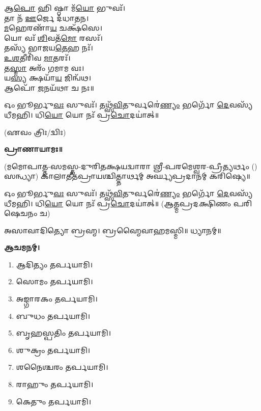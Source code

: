 𑌆\-\ul{𑌪𑍋} 𑌹𑌿 𑌷𑍍𑌠𑌾 𑌮᳴\-\ul{𑌯𑍋} 𑌭𑍁𑌵𑌃᳴।\\
𑌤𑌾 𑌨᳴ \ul{𑌊}\-𑌰𑍍𑌜𑍇 𑌦᳴𑌧𑌾𑌤𑌨।\\
\-\ul{𑌮}\-𑌹𑍇𑌰𑌣𑌾᳴\-\ul{𑌯} 𑌚𑌕𑍍𑌷᳴𑌸𑍇।\\
𑌯𑍋 𑌵𑌃᳴ \ul{𑌶𑌿}\-𑌵𑌤᳴\-\ul{𑌮𑍋} 𑌰𑌸𑌃᳴।\\
𑌤𑌸𑍍𑌯᳴ 𑌭𑌾𑌜𑌯\-\ul{𑌤𑍇}\-𑌹 𑌨𑌃᳴।\\
\-\ul{𑌉}\-\-\ul{𑌶}\-𑌤𑍀𑌰𑌿᳴𑌵 \ul{𑌮𑌾}\-𑌤𑌰𑌃᳴।\\
𑌤\-\ul{𑌸𑍍𑌮𑌾} 𑌅𑌰𑌂᳴ 𑌗𑌮𑌾𑌮 𑌵𑌃।\\
𑌯\-\ul{𑌸𑍍𑌯} 𑌕𑍍𑌷𑌯𑌾᳴\-\ul{𑌯} 𑌜𑌿𑌨𑍍𑌵᳴𑌥।\\
𑌆𑌪𑍋᳴ \ul{𑌜}\-𑌨𑌯᳴𑌥𑌾 𑌚 𑌨𑌃॥\\


𑌓𑌂 𑌭𑍂𑌰𑍍𑌭𑍁\-\ul{𑌵𑌃} 𑌸𑍁𑌵𑌃᳴। 𑌤𑌥𑍍𑌸᳴\-\ul{𑌵𑌿}\-𑌤𑍁𑌰𑍍𑌵𑌰𑍇॑\-\ul{𑌣𑍍𑌯𑌂} 𑌭𑌰𑍍𑌗𑍋᳴ \ul{𑌦𑍇}\-𑌵𑌸𑍍𑌯᳴ 𑌧𑍀𑌮𑌹𑌿। 𑌧𑌿\-\ul{𑌯𑍋} 𑌯𑍋 𑌨𑌃᳴ 𑌪𑍍𑌰\-\ul{𑌚𑍋}\-𑌦𑌯𑌾॑𑌤𑍍॥

\hfill{(𑌏𑌵𑌂 𑌤𑍍𑌰𑌿𑌃/𑌦𑍍𑌵𑌿𑌃)}


\textbf{𑌪𑍍𑌰𑌾𑌣𑌾𑌯𑌾𑌮𑌃॥}

(𑌮𑌮𑍋𑌪𑌾𑌤𑍍𑌤-𑌸𑌮𑌸𑍍𑌤-𑌦𑍁𑌰𑌿𑌤𑌕𑍍𑌷𑌯𑌦𑍍𑌵𑌾𑌰𑌾 𑌶𑍍𑌰𑍀-𑌪𑌰𑌮𑍇𑌶𑍍𑌵𑌰-𑌪𑍍𑌰𑍀𑌤𑍍𑌯𑌰𑍍𑌥𑌂 () 𑌸𑌨𑍍𑌧𑍍𑌯𑌾)
𑌕𑌾𑌲𑌾𑌤𑍀𑌤𑌪𑍍𑌰𑌾𑌯𑌶𑍍𑌚𑌿𑌤𑍍𑌤𑌾𑌰𑍍𑌥𑌮𑍍 𑌅𑌰𑍍𑌘𑍍𑌯𑌪𑍍𑌰𑌦𑌾𑌨𑌮𑍍 𑌕𑌰𑌿𑌷𑍍𑌯𑍇॥

𑌓𑌂 𑌭𑍂𑌰𑍍𑌭𑍁\-\ul{𑌵𑌃} 𑌸𑍁𑌵𑌃᳴। 𑌤𑌥𑍍𑌸᳴\-\ul{𑌵𑌿}\-𑌤𑍁𑌰𑍍𑌵𑌰𑍇॑\-\ul{𑌣𑍍𑌯𑌂} 𑌭𑌰𑍍𑌗𑍋᳴ \ul{𑌦𑍇}\-𑌵𑌸𑍍𑌯᳴ 𑌧𑍀𑌮𑌹𑌿। 𑌧𑌿\-\ul{𑌯𑍋} 𑌯𑍋 𑌨𑌃᳴ 𑌪𑍍𑌰\-\ul{𑌚𑍋}\-𑌦𑌯𑌾॑𑌤𑍍॥
\nopagebreak[4]
(𑌆𑌤𑍍𑌮𑌪𑍍𑌰𑌦𑌕𑍍𑌷𑌿𑌣𑌂 𑌪𑌰𑌿𑌷𑍇𑌚𑌨𑌂 𑌚)


𑌅𑌸𑌾𑌵𑌾𑌦𑌿𑌤𑍍𑌯𑍋 𑌬𑍍𑌰𑌹𑍍𑌮। 𑌬𑍍𑌰𑌹𑍍𑌮𑍈𑌵𑌾𑌹𑌮𑌸𑍍𑌮𑌿॥ 𑌧𑍍𑌯𑌾𑌨𑌮𑍍॥

\textbf{𑌆𑌚𑌮𑌨𑌮𑍍।}



\begin{multicols}{2}
\begin{enumerate}
 \item 𑌆𑌦𑌿𑌤𑍍𑌯𑌂 𑌤𑌰𑍍𑌪𑌯𑌾𑌮𑌿।
 \item 𑌸𑍋𑌮𑌂 𑌤𑌰𑍍𑌪𑌯𑌾𑌮𑌿।
 \item 𑌅𑌙𑍍𑌗𑌾𑌰𑌕𑌂 𑌤𑌰𑍍𑌪𑌯𑌾𑌮𑌿।
 \item 𑌬𑍁𑌧𑌂 𑌤𑌰𑍍𑌪𑌯𑌾𑌮𑌿।
 \item 𑌬𑍃𑌹𑌸𑍍𑌪𑌤𑌿𑌂 𑌤𑌰𑍍𑌪𑌯𑌾𑌮𑌿।
 \item 𑌶𑍁𑌕𑍍𑌰𑌂 𑌤𑌰𑍍𑌪𑌯𑌾𑌮𑌿।
 \item 𑌶𑌨𑍈𑌶𑍍𑌚𑌰𑌂 𑌤𑌰𑍍𑌪𑌯𑌾𑌮𑌿।
 \item 𑌰𑌾𑌹𑍁𑌂 𑌤𑌰𑍍𑌪𑌯𑌾𑌮𑌿।
 \item 𑌕𑍇𑌤𑍁𑌂 𑌤𑌰𑍍𑌪𑌯𑌾𑌮𑌿।
\end{enumerate}
\end{multicols}

